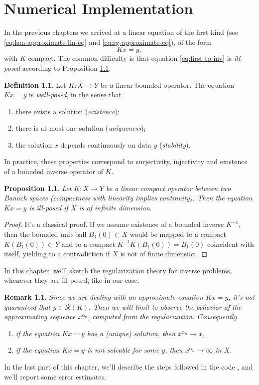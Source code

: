 \documentclass[10pt, a4paper, twoside, openright]{book}
\theoremstyle{definition}
\newtheorem{definition}[subsection]{Definition}
\theoremstyle{plain}
\theoremstyle{plain}
\theoremstyle{plain}
\newtheorem{proposition}[subsection]{Proposition}
\theoremstyle{plain}
\newtheorem{remark}[subsection]{Remark}
\theoremstyle{plain}
\theoremstyle{plain}
\theoremstyle{plain}
\theoremstyle{plain}
\begin{document}
\chapter{Numerical Implementation}
In the previous chapters we arrived at a linear equation of the first kind (see \eqref{eq:lsm-approximate-lin-eq} and \eqref{eq:rg-approximate-eq}), of the form
\begin{equation}
 Kx = y,\label{eq:first-to-inv}
\end{equation}
with $K$ compact. The common difficulty is that equation \eqref{eq:first-to-inv} is \emph{ill-posed} according to Proposition \ref{prop:ill-posed}.
\begin{definition}
 Let $K:X\to Y$ be a linear bounded operator. The equation $Kx=y$ is \emph{well-posed}, in the sense that
 \begin{enumerate}
  \item there exists a solution (\emph{existence});
  \item there is at most one solution (\emph{uniqueness});
  \item the solution $x$ depends continuously on data $y$ (\emph{stability}).
 \end{enumerate}
In practice, these properties correspond to surjectivity, injectivity and existence 
of a bounded inverse operator of $K$.
\end{definition}
\begin{proposition}
\label{prop:ill-posed}
 Let $K:X\to Y$ be a linear compact operator between two Banach spaces (compactness with linearity implies continuity). Then 
 the equation $Kx=y$ is ill-posed if $X$ is of infinite dimension.
\end{proposition}
\begin{proof}
 It's a classical proof. If we assume existence of a bounded inverse $K^{-1}$, then the bounded unit ball $B_1(0)\subset X$ would be mapped to 
 a compact $K(B_1(0))\subset Y$ and to a compact $K^{-1}K(B_1(0))=B_1(0)$ coincident with itself, yielding to a contradiction if $X$ is not of finite dimension.
\end{proof}
In this chapter, we'll sketch the regularization theory for inverse problems, whenever they are ill-posed, like in our case.
\begin{remark}
 Since we are dealing with an approximate equation $Kx=y$, it's not guaranteed that $y\in \mathcal{R}(K)$. 
 Then we will limit to observe the behavior of the approximating sequence $x^{\alpha_n}$, computed from the regularization.
 Consequently
 \begin{enumerate}
  \item if the equation $Kx=y$ has a (unique) solution, then $x^{\alpha_n}\to x$,
  \item if the equation $Kx=y$ is not solvable for some $y$, then $x^{\alpha_n}\to \infty$ in $X$.
 \end{enumerate}
\end{remark}
In the last part of this chapter, we'll describe the steps followed in the code \cite{}, and we'll report some error estimates.
\end{document}
